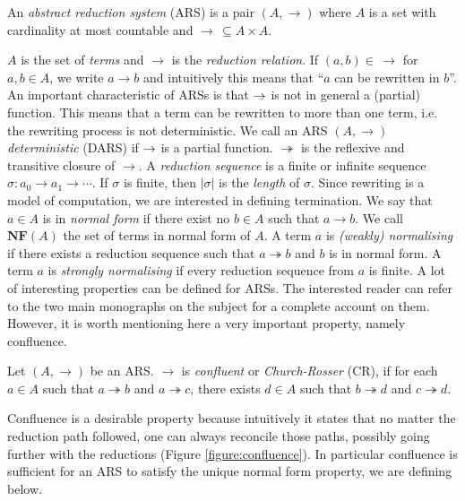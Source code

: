 \begin{definition}
	An \emph{abstract reduction system} (ARS) is a pair $(A,\rightarrow)$ where $A$ is a set with cardinality at most countable and $\rightarrow\,\subseteq A\times A$.
\end{definition}
$A$ is the set of \emph{terms} and $\rightarrow$ is the \emph{reduction relation}. If $(a,b)\in\,\rightarrow$ for $a,b\in A$, we write $a\rightarrow b$ and intuitively this means that ``$a$ can be rewritten in $b$''. An important characteristic of ARSs is that $\rightarrow$ is not in general a (partial) function. This means that a term can be rewritten to more than one term, i.e. the rewriting process is not deterministic. We call an ARS $(A,\rightarrow)$ \emph{deterministic} (DARS) if $\rightarrow$ is a partial function. $\twoheadrightarrow$ is the reflexive and transitive closure of $\rightarrow$. A \emph{reduction sequence} is a finite or infinite sequence $\sigma:a_0\rightarrow a_1\rightarrow\cdots$. If $\sigma$ is finite, then $|\sigma|$ is the \emph{length} of $\sigma$. Since rewriting is a model of computation, we are interested in defining termination. We say that $a\in A$ is in \emph{normal form} if there exist no $b\in A$ such that $a\rightarrow b$. We call $\mathbf{NF}(A)$ the set of terms in normal form of $A$. A term $a$ is \emph{(weakly) normalising} if there exists a reduction sequence such that $a\twoheadrightarrow b$ and $b$ is in normal form. A term $a$ is \emph{strongly normalising} if every reduction sequence from $a$ is finite.  A lot of interesting properties can be defined for ARSs. The interested reader can refer to the two main monographs on the subject \cite{terese_term_2003,baader_term_1999} for a complete account on them. However, it is worth mentioning here a very important property, namely confluence.
\begin{definition}
	Let $(A,\rightarrow)$ be an ARS. $\rightarrow$ is \emph{confluent} or \emph{Church-Rosser} (CR), if for each $a\in A$ such that $a\twoheadrightarrow b$ and $a\twoheadrightarrow c$, there exists $d\in A$ such that $b\twoheadrightarrow d$ and $c\twoheadrightarrow d$.
\end{definition}
Confluence is a desirable property because intuitively it states that no matter the reduction path followed, one can always reconcile those paths, possibly going further with the reductions (Figure \ref{figure:confluence}). In particular confluence is sufficient for an ARS to satisfy the unique normal form property, we are defining below.
